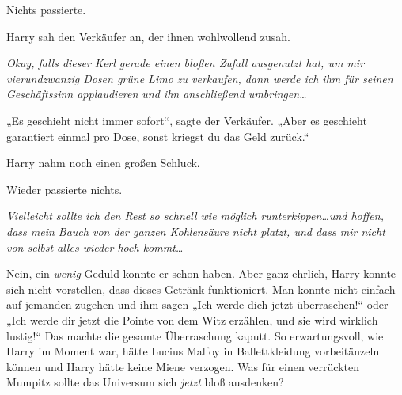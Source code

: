 Nichts passierte.

Harry sah den Verkäufer an, der ihnen wohlwollend zusah.

\emph{Okay, falls dieser Kerl gerade einen bloßen Zufall ausgenutzt hat, um mir vierundzwanzig Dosen grüne Limo zu verkaufen, dann werde ich ihm für seinen Geschäftssinn applaudieren und ihn anschließend umbringen…}

„Es geschieht nicht immer sofort“, sagte der Verkäufer. „Aber es geschieht garantiert einmal pro Dose, sonst kriegst du das Geld zurück.“

Harry nahm noch einen großen Schluck.

Wieder passierte nichts.

\emph{Vielleicht sollte ich den Rest so schnell wie möglich runterkippen…und hoffen, dass mein Bauch von der ganzen Kohlensäure nicht platzt, und dass mir nicht von selbst alles wieder hoch kommt…}

Nein, ein \emph{wenig} Geduld konnte er schon haben. Aber ganz ehrlich, Harry konnte sich nicht vorstellen, dass dieses Getränk funktioniert. Man konnte nicht einfach auf jemanden zugehen und ihm sagen „Ich werde dich jetzt überraschen!“ oder „Ich werde dir jetzt die Pointe von dem Witz erzählen, und sie wird wirklich lustig!“ Das machte die gesamte Überraschung kaputt. So erwartungsvoll, wie Harry im Moment war, hätte Lucius Malfoy in Ballettkleidung vorbeitänzeln können und Harry hätte keine Miene verzogen. Was für einen verrückten Mumpitz sollte das Universum sich \emph{jetzt} bloß ausdenken?

